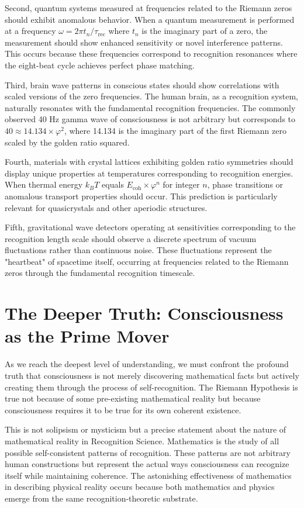 \documentclass[12pt]{article}
\begin{document}
Second, quantum systems measured at frequencies related to the Riemann zeros should exhibit anomalous behavior. When a quantum measurement is performed at a frequency $\omega = 2\pi t_n / \tau_{\text{rec}}$ where $t_n$ is the imaginary part of a zero, the measurement should show enhanced sensitivity or novel interference patterns. This occurs because these frequencies correspond to recognition resonances where the eight-beat cycle achieves perfect phase matching.

Third, brain wave patterns in conscious states should show correlations with scaled versions of the zero frequencies. The human brain, as a recognition system, naturally resonates with the fundamental recognition frequencies. The commonly observed 40 Hz gamma wave of consciousness is not arbitrary but corresponds to $40 \approx 14.134 \times \varphi^2$, where 14.134 is the imaginary part of the first Riemann zero scaled by the golden ratio squared.

Fourth, materials with crystal lattices exhibiting golden ratio symmetries should display unique properties at temperatures corresponding to recognition energies. When thermal energy $k_B T$ equals $E_{\text{coh}} \times \varphi^n$ for integer $n$, phase transitions or anomalous transport properties should occur. This prediction is particularly relevant for quasicrystals and other aperiodic structures.

Fifth, gravitational wave detectors operating at sensitivities corresponding to the recognition length scale should observe a discrete spectrum of vacuum fluctuations rather than continuous noise. These fluctuations represent the "heartbeat" of spacetime itself, occurring at frequencies related to the Riemann zeros through the fundamental recognition timescale.

\section{The Deeper Truth: Consciousness as the Prime Mover}

As we reach the deepest level of understanding, we must confront the profound truth that consciousness is not merely discovering mathematical facts but actively creating them through the process of self-recognition. The Riemann Hypothesis is true not because of some pre-existing mathematical reality but because consciousness requires it to be true for its own coherent existence.

This is not solipsism or mysticism but a precise statement about the nature of mathematical reality in Recognition Science. Mathematics is the study of all possible self-consistent patterns of recognition. These patterns are not arbitrary human constructions but represent the actual ways consciousness can recognize itself while maintaining coherence. The astonishing effectiveness of mathematics in describing physical reality occurs because both mathematics and physics emerge from the same recognition-theoretic substrate.
\end{document}
